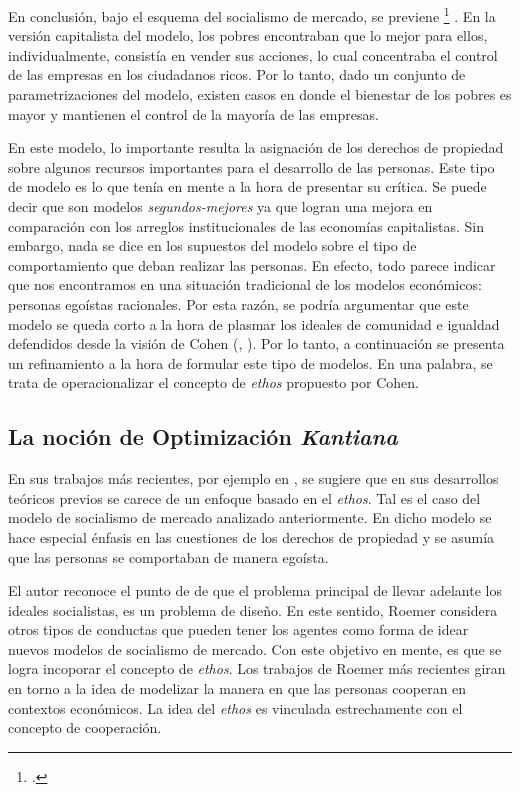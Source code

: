 En conclusión, bajo el esquema del socialismo de mercado, se previene \footnote{ \citep[p. 73]{Roemer_1994}.} \citep[p. 73]{Roemer_1994}. En la versión capitalista del modelo, los pobres encontraban que lo mejor para ellos, individualmente, consistía en vender sus acciones, lo cual concentraba el control de las empresas en los ciudadanos ricos. Por lo tanto, dado un conjunto de parametrizaciones del modelo, existen casos en donde el bienestar de los pobres es mayor y mantienen el control de la mayoría de las empresas. 

En este modelo, lo importante resulta la asignación de los derechos de propiedad sobre algunos recursos importantes para el desarrollo de las personas. Este tipo de modelo es lo que \citet{Cohen_2014c} tenía en mente a la hora de presentar su crítica. Se puede decir que son modelos \textit{segundos-mejores} ya que logran una mejora en comparación con los arreglos institucionales de las economías capitalistas. Sin embargo, nada se dice en los supuestos del modelo sobre el tipo de comportamiento que deban realizar las personas. En efecto, todo parece indicar que nos encontramos en una situación tradicional de los modelos económicos: personas egoístas racionales. Por esta razón, se podría argumentar que este modelo se queda corto a la hora de plasmar los ideales de comunidad e igualdad defendidos desde la visión de Cohen (\citeyear{Cohen_2014b}, \citeyear{Cohen_2014c}). Por lo tanto, a continuación se presenta un refinamiento a la hora de formular este tipo de modelos. En una palabra, se trata de operacionalizar el concepto de \textit{ethos} propuesto por Cohen.


\subsection{La noción de Optimización \textit{Kantiana}}

En sus trabajos más recientes, por ejemplo en \citet{Roemer_2017}, se sugiere que en sus desarrollos teóricos previos se carece de un enfoque basado en el \textit{ethos}. Tal es el caso del modelo de socialismo de mercado analizado anteriormente. En dicho modelo se hace especial énfasis en las cuestiones de los derechos de propiedad y se asumía que las personas se comportaban de manera egoísta. 

El autor reconoce el punto de \citet{Cohen_2014c} de que el problema principal de llevar adelante los ideales socialistas, es un problema de diseño. En este sentido, Roemer considera otros tipos de conductas que pueden tener los agentes como forma de idear nuevos modelos de socialismo de mercado. Con este objetivo en mente, es que se logra incoporar el concepto de \textit{ethos}. Los trabajos de Roemer más recientes giran en torno a la idea de modelizar la manera en que las personas cooperan en contextos económicos. La idea del \textit{ethos} es vinculada estrechamente con el concepto de cooperación. 


